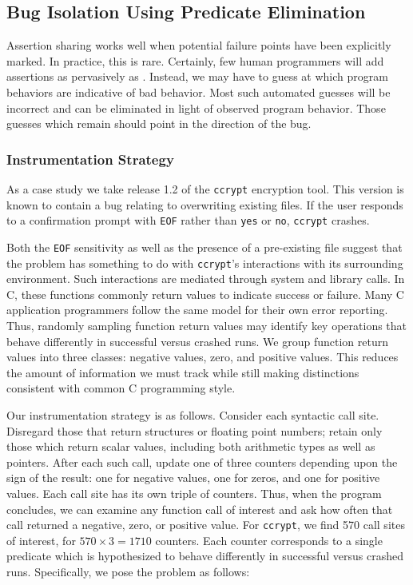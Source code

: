 \subsection{Bug Isolation Using Predicate Elimination}
\label{sec:ccrypt}

Assertion sharing works well when potential failure points have been
explicitly marked.  In practice, this is rare.  Certainly, few human
programmers will add assertions as pervasively as \CCured.  Instead,
we may have to guess at which program behaviors are indicative of bad
behavior.  Most such automated guesses will be incorrect and can be
eliminated in light of observed program behavior.  Those guesses which
remain should point in the direction of the bug.

\subsubsection{Instrumentation Strategy}

As a case study we take release 1.2 of the \texttt{ccrypt} encryption
tool.  This version is known to contain a bug relating to overwriting
existing files.  If the user responds to a confirmation prompt with
\texttt{EOF} rather than \texttt{yes} or \texttt{no}, \texttt{ccrypt}
crashes.

Both the \texttt{EOF} sensitivity as well as the presence of a
pre-existing file suggest that the problem has something to do with
\texttt{ccrypt}'s interactions with its surrounding environment.  Such
interactions are mediated through system and library calls.  In C,
these functions commonly return values to indicate success or failure.
Many C application programmers follow the same model for their own
error reporting.  Thus, randomly sampling function return values may
identify key operations that behave differently in successful versus
crashed runs.  We group function return values into three classes:
negative values, zero, and positive values.  This reduces the amount
of information we must track while still making distinctions
consistent with common C programming style.

Our instrumentation strategy is as follows.  Consider each syntactic
call site.  Disregard those that return structures or floating point
numbers; retain only those which return scalar values, including both
arithmetic types as well as pointers.  After each such call, update
one of three counters depending upon the sign of the result: one for
negative values, one for zeros, and one for positive values.  Each
call site has its own triple of counters.  Thus, when the program
concludes, we can examine any function call of interest and ask how
often that call returned a negative, zero, or positive value.  For
\texttt{ccrypt}, we find 570 call sites of interest, for $570 \times 3 =
1710$ counters.  Each counter corresponds to a single predicate which
is hypothesized to behave differently in successful versus crashed
runs.  Specifically, we pose the problem as follows:

